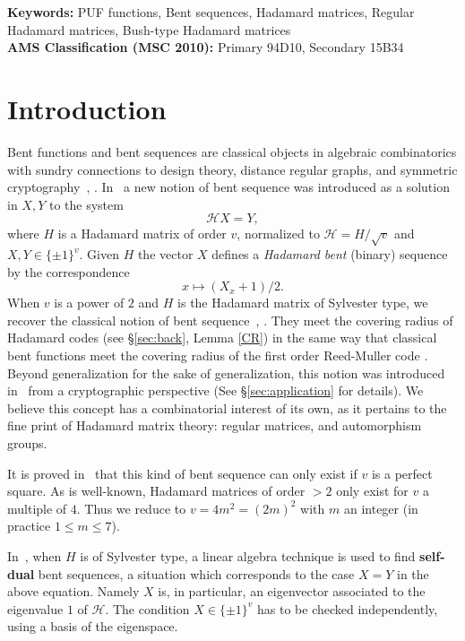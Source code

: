 \documentclass[12pt]{article}
\begin{document}
{\bf Keywords:} PUF functions, Bent sequences, Hadamard matrices, Regular Hadamard matrices, Bush-type Hadamard matrices\\


{\bf AMS Classification (MSC 2010):} Primary 94D10, Secondary 15B34
\section{Introduction}
Bent functions and bent sequences are classical objects in algebraic combinatorics with sundry connections to design theory, distance regular graphs, and symmetric cryptography~\cite{Mesnager:2016:Bent}, \cite{Tokareva:2015}.
In~\cite{SCGR:2021isit} a new notion of bent sequence was introduced as a solution in $X,Y$ to the system
$$\mathcal{H}X=Y, $$
where $H$ is a  Hadamard matrix of order $v$, normalized to $\mathcal{H}=H/\sqrt{v}$ and  $X,Y \in \{\pm 1\}^v$.
Given $H$ the vector $X$ defines a {\it Hadamard bent} (binary) sequence by the correspondence
$$x\mapsto (X_x+1)/2. $$
When $v$ is a power of $2$ and  $H$ is the Hadamard matrix of  Sylvester type,  we recover the classical notion of bent sequence~\cite{Mesnager:2016:Bent}, \cite{Tokareva:2015}. They meet
the covering radius of Hadamard codes (see \S \ref{sec:back}, Lemma \ref{CR}) in the same
way that classical bent functions meet the covering radius of the first order Reed-Muller code \cite[Chap.14,\,Th.6]{MWS}. Beyond generalization for the sake of generalization, this notion was introduced in~\cite{SCGR:2021isit} from a cryptographic perspective (See \S \ref{sec:application} for details).
We believe this concept has a combinatorial interest of its own, as it pertains to the fine print of Hadamard matrix theory: regular matrices, and automorphism groups.

It is proved in~\cite{SCGR:2021isit} that this
kind of bent sequence can only exist if $v $ is a perfect square. As is well-known, Hadamard matrices of order $>2$ only exist for $v$ a multiple of $4$. Thus we reduce to $v=4m^2=(2m)^2$ with $m$ an integer (in practice $1 \le m \le 7$).

In~\cite{CDPS:2010}, when $H$ is of Sylvester type, a linear algebra technique is used to find {\bf self-dual} bent sequences, a situation
which corresponds to the case $X=Y$ in the above equation. Namely $X$ is, in particular, an eigenvector
associated to the eigenvalue $1$ of $\mathcal{H}$. The condition $X \in \{\pm 1\}^v$ has to be checked independently, using a basis of the eigenspace.
\end{document}
